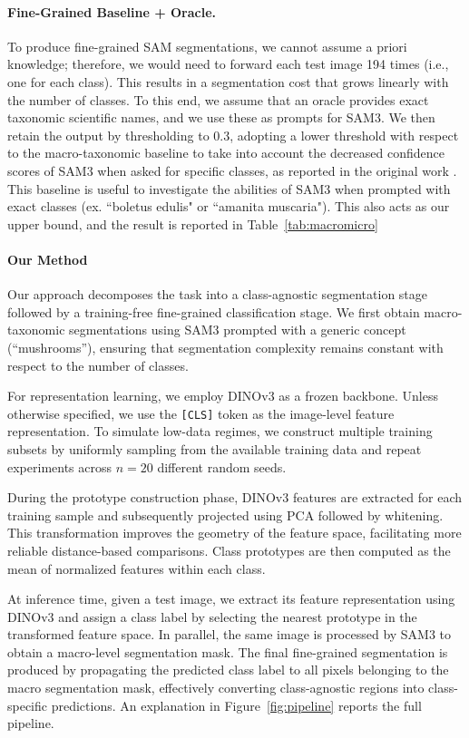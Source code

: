 \paragraph{Fine-Grained Baseline + Oracle.} To produce fine-grained SAM segmentations, we cannot assume a priori knowledge; therefore, we would need to forward each test image 194 times (i.e., one for each class). This results in a segmentation cost that grows linearly with the number of classes. To this end, we assume that an oracle provides exact taxonomic scientific names, and we use these as prompts for SAM3. We then retain the output by thresholding to 0.3, adopting a lower threshold with respect to the macro-taxonomic baseline to take into account the decreased confidence scores of SAM3 when asked for specific classes, as reported in the original work \cite{carion2025sam3segmentconcepts}. This baseline is useful to investigate the abilities of SAM3 when prompted with exact classes (ex. ``boletus edulis" or ``amanita muscaria"). This also acts as our upper bound, and the result is reported in Table~\ref{tab:macromicro}

\paragraph{Our Method}
Our approach decomposes the task into a class-agnostic segmentation stage followed by a training-free fine-grained classification stage. We first obtain macro-taxonomic segmentations using SAM3 prompted with a generic concept (``mushrooms''), ensuring that segmentation complexity remains constant with respect to the number of classes.

For representation learning, we employ DINOv3 \cite{simeoni2025dinov3} as a frozen backbone. Unless otherwise specified, we use the \texttt{[CLS]} token as the image-level feature representation. To simulate low-data regimes, we construct multiple training subsets by uniformly sampling from the available training data and repeat experiments across $n=20$ different random seeds.

During the prototype construction phase, DINOv3 features are extracted for each training sample and subsequently projected using PCA followed by whitening. This transformation improves the geometry of the feature space, facilitating more reliable distance-based comparisons. Class prototypes are then computed as the mean of normalized features within each class.

At inference time, given a test image, we extract its feature representation using DINOv3 and assign a class label by selecting the nearest prototype in the transformed feature space. In parallel, the same image is processed by SAM3 to obtain a macro-level segmentation mask. The final fine-grained segmentation is produced by propagating the predicted class label to all pixels belonging to the macro segmentation mask, effectively converting class-agnostic regions into class-specific predictions. An explanation in Figure~\ref{fig:pipeline} reports the full pipeline.



